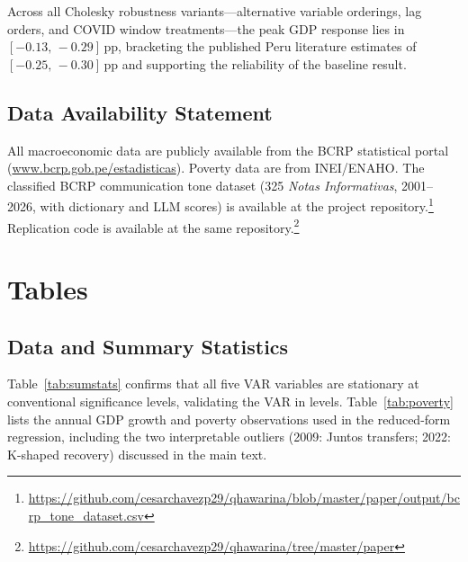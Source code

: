 \documentclass[12pt,letterpaper]{article}
\newenvironment{mytable}[2]{%
  \begin{table}[H]
  \centering
  \caption{#1}
  \label{#2}
  \begin{threeparttable}
}{%
  \end{threeparttable}
  \end{table}
}
\begin{document}
Across all Cholesky robustness variants---alternative variable orderings,
lag orders, and COVID window treatments---the peak GDP response lies in
$[-0.13,\,-0.29]$\,pp, bracketing the published Peru literature estimates
of $[-0.25,\,-0.30]$\,pp and supporting the reliability of the baseline
result.

\subsection*{Data Availability Statement}

All macroeconomic data are publicly available from the BCRP statistical
portal (\url{www.bcrp.gob.pe/estadisticas}). Poverty data are from
INEI/ENAHO. The classified BCRP communication tone dataset (325
\textit{Notas Informativas}, 2001--2026, with dictionary and LLM scores)
is available at the project repository.\footnote{\url{https://github.com/cesarchavezp29/qhawarina/blob/master/paper/output/bcrp_tone_dataset.csv}}
Replication code is available at the same repository.\footnote{\url{https://github.com/cesarchavezp29/qhawarina/tree/master/paper}}

\newpage



\appendix

\setcounter{figure}{0}
\setcounter{table}{0}
\renewcommand{\thefigure}{A\arabic{figure}}
\renewcommand{\thetable}{A\arabic{table}}

\section{Tables}
\label{app:tables}

\subsection*{Data and Summary Statistics}

\begin{mytable}{Summary Statistics, 2004Q2--2025Q3}{tab:sumstats}
  
\end{mytable}

Table~\ref{tab:sumstats} confirms that all five VAR variables are stationary
at conventional significance levels, validating the VAR in levels.
Table~\ref{tab:poverty} lists the annual GDP growth and poverty observations
used in the reduced-form regression, including the two interpretable outliers
(2009: Juntos transfers; 2022: K-shaped recovery) discussed in the main text.
\end{document}
